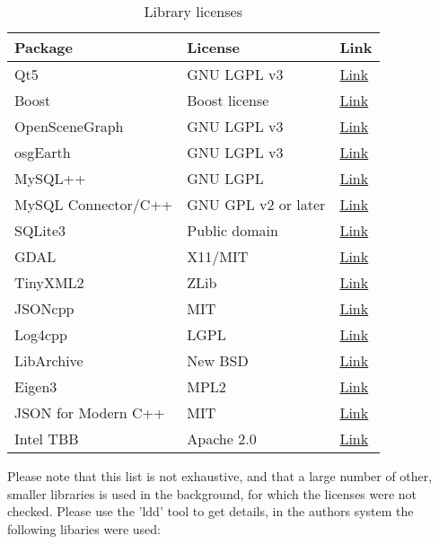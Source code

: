 \begin{table}[H]
  \center
  \begin{tabular}{ | l | l | l |}
    \hline
    \textbf{Package} & \textbf{License} & \textbf{Link} \\ \hline
    Qt5 & GNU LGPL v3 &\href{https://doc.qt.io/qt-5.10/licensing.html}{Link} \\ \hline
    Boost & Boost license  & \href{https://www.boost.org/users/license.html}{Link} \\ \hline
    OpenSceneGraph & GNU LGPL v3 &\href{http://www.openscenegraph.org/index.php/about/licensing}{Link} \\ \hline
    osgEarth & GNU LGPL v3 &\href{hhttps://github.com/gwaldron/osgearth/blob/master/LICENSE.txt}{Link} \\ \hline    
    MySQL++ & GNU LGPL & \href{https://tangentsoft.com/mysqlpp/wiki?name=FAQ}{Link} \\ \hline
    MySQL Connector/C++ & GNU GPL v2 or later & \href{https://downloads.mysql.com/docs/licenses/connector-cpp-gpl-en.pdf}{Link} \\ \hline
    SQLite3 & Public domain & \href{https://www.sqlite.org/copyright.html}{Link} \\ \hline
    GDAL & X11/MIT & \href{https://trac.osgeo.org/gdal/wiki/FAQGeneral#WhatlicensedoesGDALOGRuse}{Link} \\ \hline
    TinyXML2 & ZLib & \href{http://leethomason.github.io/tinyxml2/}{Link} \\ \hline
    JSONcpp & MIT & \href{https://github.com/open-source-parsers/jsoncpp/blob/master/LICENSE}{Link} \\ \hline    
    Log4cpp & LGPL & \href{http://log4cpp.sourceforge.net/#license}{Link} \\ \hline
    LibArchive & New BSD & \href{https://raw.githubusercontent.com/libarchive/libarchive/master/COPYING}{Link} \\ \hline
    Eigen3 & MPL2 & \href{http://eigen.tuxfamily.org/index.php?title=Main_Page}{Link} \\ \hline
    JSON for Modern C++ & MIT & \href{https://github.com/nlohmann/json}{Link} \\ \hline
    Intel TBB & Apache 2.0 & \href{https://www.threadingbuildingblocks.org/}{Link} \\ \hline
    \hline
  \end{tabular}
  \caption{Library licenses}
\end{table}

Please note that this list is not exhaustive, and that a large number of other, smaller libraries is used in the background, for which the licenses were not checked. Please use the 'ldd' tool to get details, in the authors system the following libaries were used:

